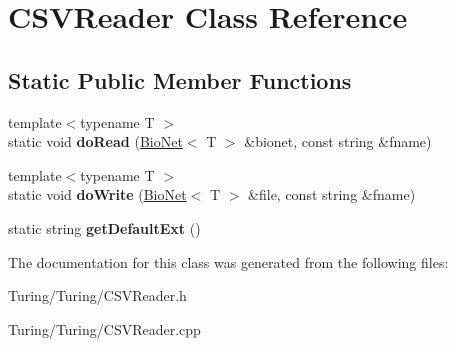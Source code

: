 \hypertarget{class_c_s_v_reader}{}\section{C\+S\+V\+Reader Class Reference}
\label{class_c_s_v_reader}
\subsection*{Static Public Member Functions}
\begin{DoxyCompactItemize}
\item 
\mbox{\label{class_c_s_v_reader_acbec14efb05c8de0e406a55c56b85fe8}} 
{\footnotesize template$<$typename T $>$ }\\static void {\bfseries do\+Read} (\hyperlink{class_bio_net}{Bio\+Net}$<$ T $>$ \&bionet, const string \&fname)
\item 
\mbox{\label{class_c_s_v_reader_ae7e9cddd52db8db7cc806c9d05e74fa7}} 
{\footnotesize template$<$typename T $>$ }\\static void {\bfseries do\+Write} (\hyperlink{class_bio_net}{Bio\+Net}$<$ T $>$ \&file, const string \&fname)
\item 
\mbox{\label{class_c_s_v_reader_a09e765b08b39a037268a7a31b8729cf7}} 
static string {\bfseries get\+Default\+Ext} ()
\end{DoxyCompactItemize}


The documentation for this class was generated from the following files\+:\begin{DoxyCompactItemize}
\item 
Turing/\+Turing/C\+S\+V\+Reader.\+h\item 
Turing/\+Turing/C\+S\+V\+Reader.\+cpp\end{DoxyCompactItemize}
